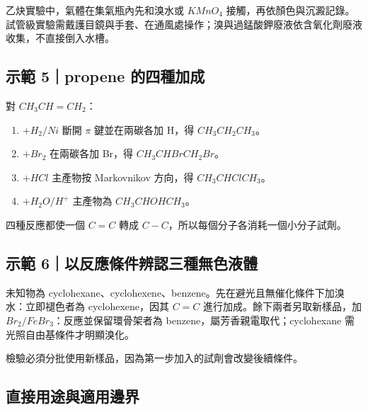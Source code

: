 \documentclass[11pt,a4paper]{article}
\providecommand{\tightlist}{%
  \setlength{\itemsep}{0pt}\setlength{\parskip}{0pt}}
\begin{document}
乙炔實驗中，氣體在集氣瓶內先和溴水或 \(KMnO_4\) 接觸，再依顏色與沉澱記錄。試管級實驗需戴護目鏡與手套、在通風處操作；溴與過錳酸鉀廢液依含氧化劑廢液收集，不直接倒入水槽。

\begin{HandoutWorkedExample}

\subsection{示範 5｜propene 的四種加成}\label{ux793aux7bc4-5propene-ux7684ux56dbux7a2eux52a0ux6210}

對 \(CH_3CH=CH_2\)：

\begin{enumerate}
\def\labelenumi{\arabic{enumi}.}
\tightlist
\item
  \(+H_2/Ni\) 斷開 \(\pi\) 鍵並在兩碳各加 H，得 \(CH_3CH_2CH_3\)。
\item
  \(+Br_2\) 在兩碳各加 Br，得 \(CH_3CHBrCH_2Br\)。
\item
  \(+HCl\) 主產物按 Markovnikov 方向，得 \(CH_3CHClCH_3\)。
\item
  \(+H_2O/H^+\) 主產物為 \(CH_3CHOHCH_3\)。
\end{enumerate}

四種反應都使一個 \(C=C\) 轉成 \(C-C\)，所以每個分子各消耗一個小分子試劑。

\end{HandoutWorkedExample}

\begin{HandoutWorkedExample}

\subsection{示範 6｜以反應條件辨認三種無色液體}\label{ux793aux7bc4-6ux4ee5ux53cdux61c9ux689dux4ef6ux8fa8ux8a8dux4e09ux7a2eux7121ux8272ux6db2ux9ad4}

未知物為 cyclohexane、cyclohexene、benzene。先在避光且無催化條件下加溴水：立即褪色者為 cyclohexene，因其 \(C=C\) 進行加成。餘下兩者另取新樣品，加 \(Br_2/FeBr_3\)：反應並保留環骨架者為 benzene，屬芳香親電取代；cyclohexane 需光照自由基條件才明顯溴化。

檢驗必須分批使用新樣品，因為第一步加入的試劑會改變後續條件。

\end{HandoutWorkedExample}

\subsection{直接用途與適用邊界}\label{ux76f4ux63a5ux7528ux9014ux8207ux9069ux7528ux908aux754c-2}
\end{document}
